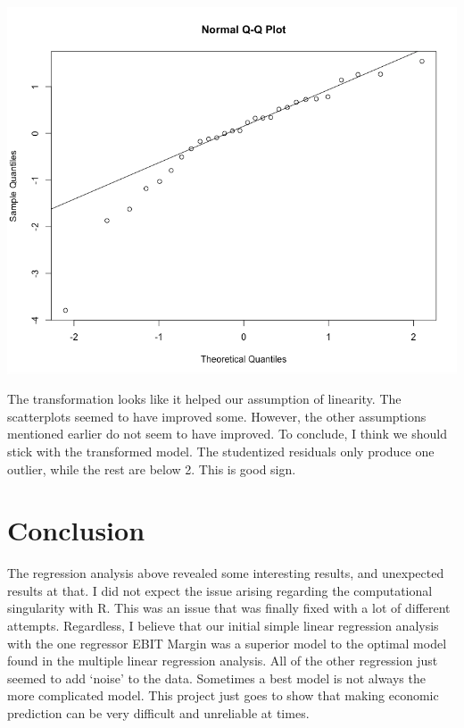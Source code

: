 \documentclass[12pt,letterpaper]{article}
\begin{document}
\begin{center}
\includegraphics[scale=0.5]{pic17.png}
\end{center}

The transformation looks like it helped our assumption of linearity. The scatterplots seemed to have improved some. However, the other assumptions mentioned earlier do not seem to have improved. To conclude, I think we should stick with the transformed model. The studentized residuals only produce one outlier, while the rest are below 2. This is good sign.

\section*{Conclusion}

The regression analysis above revealed some interesting results, and unexpected results at that. I did not expect the issue arising regarding the computational singularity with R. This was an issue that was finally fixed with a lot of different attempts. Regardless, I believe that our initial simple linear regression analysis with the one regressor EBIT Margin was a superior model to the optimal model found in the multiple linear regression analysis. All of the other regression just seemed to add `noise' to the data. Sometimes a best model is not always the more complicated model. This project just goes to show that making economic prediction can be very difficult and unreliable at times.



\end{document}
